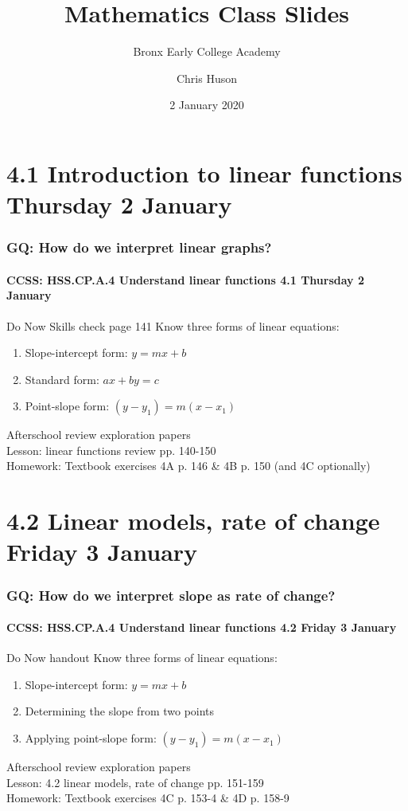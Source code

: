 \documentclass{beamer}
\title{Mathematics Class Slides}
\subtitle{Bronx Early College Academy}
\author{Chris Huson}
\date{2 January 2020}
\begin{document}
\frame{\titlepage}
\section[Outline]{}
\frame{\tableofcontents}

\section{4.1 Introduction to linear functions Thursday 2 January}
\frame
{
  \frametitle{GQ: How do we interpret linear graphs?}
  \framesubtitle{CCSS: HSS.CP.A.4 Understand linear functions \hfill \alert{4.1 Thursday 2 January}}

  \begin{block}{Do Now Skills check page 141}%
    Know three forms of linear equations:
  \begin{enumerate}
      \item Slope-intercept form: $y=mx+b$
      \item Standard form: $ax+by=c$
      \item Point-slope form: $(y-y_1)=m(x-x_1)$
  \end{enumerate}
  \end{block}
  Afterschool review exploration papers\\ \smallskip
  Lesson: linear functions review pp. 140-150 \\ \smallskip
  Homework: Textbook exercises 4A p. 146 \& 4B p. 150 (and 4C optionally)
}

\section{4.2 Linear models, rate of change Friday 3 January}
\frame
{
  \frametitle{GQ: How do we interpret slope as rate of change?}
  \framesubtitle{CCSS: HSS.CP.A.4 Understand linear functions \hfill \alert{4.2 Friday 3 January}}

  \begin{block}{Do Now handout}
    Know three forms of linear equations:
  \begin{enumerate}
      \item Slope-intercept form: $y=mx+b$
      \item Determining the slope from two points
      \item Applying point-slope form: $(y-y_1)=m(x-x_1)$
  \end{enumerate}
  \end{block}
  Afterschool review exploration papers\\ \smallskip
  Lesson: 4.2 linear models, rate of change pp. 151-159 \\ \smallskip
  Homework: Textbook exercises 4C p. 153-4 \& 4D p. 158-9
}
\end{document}
